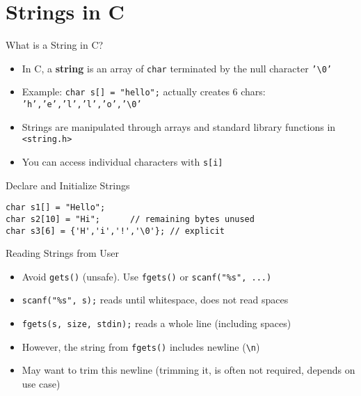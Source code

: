 \documentclass[12pt, aspectratio=169]{beamer}
\begin{document}
    \section{Strings in C}

    \begin{frame}{What is a String in C?}
        \begin{itemize}
            \item In C, a \textbf{string} is an array of \texttt{char} terminated by the null character \texttt{'\textbackslash0'}
            \item Example: \texttt{char s[] = "hello";} actually creates 6 chars: \texttt{'h','e','l','l','o','\textbackslash0'}
            \item Strings are manipulated through arrays and standard library functions in \texttt{<string.h>}
            \item You can access individual characters with \texttt{s[i]}
        \end{itemize}
    \end{frame}


    \begin{frame}[fragile]{Declare and Initialize Strings}
        \begin{verbatim}
char s1[] = "Hello";
char s2[10] = "Hi";      // remaining bytes unused
char s3[6] = {'H','i','!','\0'}; // explicit
        \end{verbatim}
    \end{frame}


    \begin{frame}[fragile]{Reading Strings from User}
        \begin{itemize}
            \item Avoid \texttt{gets()} (unsafe). Use \texttt{fgets()} or \texttt{scanf("\%s", ...)}
            \item \texttt{scanf("\%s", s);} reads until whitespace, does not read spaces
            \item \texttt{fgets(s, size, stdin);} reads a whole line (including spaces)
            \item However, the string from \texttt{fgets()} includes newline (\verb|\n|)
            \item May want to trim this newline (trimming it, is often not required, depends on use case)
        \end{itemize}
    \end{frame}
\end{document}
